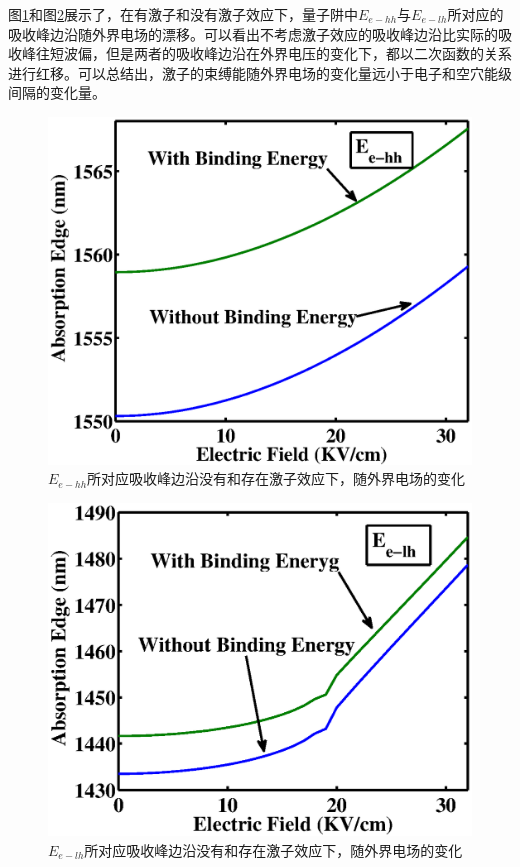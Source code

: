 图\ref{fig_ch2_ex_abs1}和图\ref{fig_ch2_ex_abs2}展示了，在有激子和没有激子效应下，量子阱中$E_{e-hh}$与$E_{e-lh}$所对应的吸收峰边沿随外界电场的漂移。可以看出不考虑激子效应的吸收峰边沿比实际的吸收峰往短波偏，但是两者的吸收峰边沿在外界电压的变化下，都以二次函数的关系进行红移。可以总结出，激子的束缚能随外界电场的变化量远小于电子和空穴能级间隔的变化量。
\begin{figure}[htb]
	\centering
	\includegraphics[width=12cm]{./Pictures/fig_ch2_ex_abs1.eps}
	\caption{$E_{e-hh}$所对应吸收峰边沿没有和存在激子效应下，随外界电场的变化}
	\label{fig_ch2_ex_abs1}
\end{figure}
\begin{figure}[htb]
	\centering
	\includegraphics[width=12cm]{./Pictures/fig_ch2_ex_abs2.eps}
	\caption{$E_{e-lh}$所对应吸收峰边沿没有和存在激子效应下，随外界电场的变化}
	\label{fig_ch2_ex_abs2}
\end{figure}

